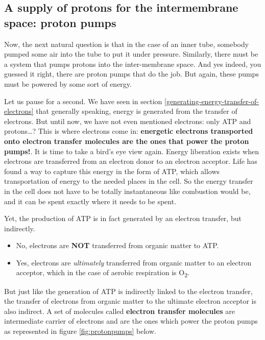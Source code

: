 \documentclass[]{book}
\providecommand{\tightlist}{%
  \setlength{\itemsep}{0pt}\setlength{\parskip}{0pt}}
\theoremstyle{definition}
\theoremstyle{definition}
\theoremstyle{definition}
\theoremstyle{remark}
\begin{document}
\subsection{A supply of protons for the intermembrane space: proton
pumps}\label{a-supply-of-protons-for-the-intermembrane-space-proton-pumps}

Now, the next natural question is that in the case of an inner tube,
somebody pumped some air into the tube to put it under pressure.
Similarly, there must be a system that pumps protons into the
inter-membrane space. And yes indeed, you guessed it right, there are
proton pumps that do the job. But again, these pumps must be powered by
some sort of energy.

Let us pause for a second. We have seen in section
\ref{generating-energy-transfer-of-electrons} that generally speaking,
energy is generated from the transfer of electrons. But until now, we
have not even mentioned electrons: only ATP and protons\ldots{}? This is
where electrons come in: \textbf{energetic electrons transported onto
electron transfer molecules are the ones that power the proton pumps!}.
It is time to take a bird's eye view again. Energy liberation exists
when electrons are transferred from an electron donor to an electron
acceptor. Life has found a way to capture this energy in the form of
ATP, which allows transportation of energy to the needed places in the
cell. So the energy transfer in the cell does not have to be totally
instantaneous like combustion would be, and it can be spent exactly
where it needs to be spent.

Yet, the production of ATP is in fact generated by an electron transfer,
but indirectly.

\begin{itemize}
\tightlist
\item
  No, electrons are \textbf{NOT} transferred from organic matter to ATP.
\item
  Yes, electrons are \emph{ultimately} transferred from organic matter
  to an electron acceptor, which in the case of aerobic respiration is
  O\textsubscript{2}.
\end{itemize}

But just like the generation of ATP is indirectly linked to the electron
transfer, the transfer of electrons from organic matter to the ultimate
electron acceptor is also indirect. A set of molecules called
\textbf{electron transfer molecules} are intermediate carrier of
electrons and are the ones which power the proton pumps as represented
in figure \ref{fig:protonpumps} below.
\end{document}
